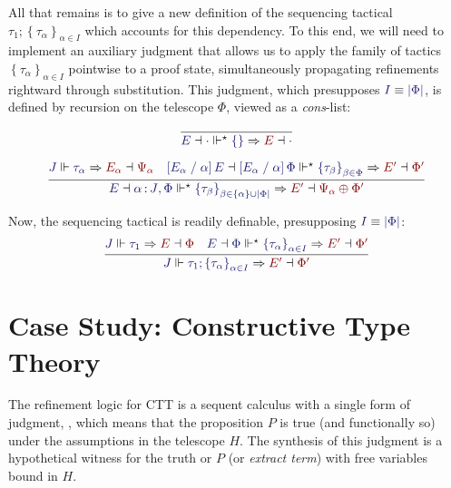 \documentclass[11pt]{article}
\theoremstyle{definition}
\theoremstyle{remark}
\numberwithin{equation}{section}
\def\IModeColorName{MidnightBlue}
\def\OModeColorName{Maroon}
\newcommand\IMode[1]{{\color{\IModeColorName}{#1}}}
\newcommand\OMode[1]{{\color{\OModeColorName}{#1}}}
\newcommand\JJ{J}
\newcommand\MkSet[1]{\left\{#1\right\}}
\newcommand\MkFam[3]{\MkSet{#1_{#2}}_{#2\in #3}}
\newcommand\ISG[2]{\IMode{#1}\,{\color{Black}:}\,\IMode{#2}}
\newcommand\Refine[4]{\IMode{#1}\Vdash\IMode{#2}\Rightarrow\OMode{#4}\dashv\OMode{#3}}
\newcommand\ThenMultiAux[5]{%
  \IMode{#2}\dashv\IMode{#3}%
  \Vdash^\star\IMode{#1}\Rightarrow%
  \OMode{#4}\dashv\OMode{#5}%
}
\newcommand\ThenTac[2]{#1;#2}
\newcommand\Dom[1]{\left\vert#1\right\vert}
\newcommand\Subst[3]{\left[#1\;/\;#2\right]#3}
\newcommand\IsEquiv[2]{\IMode{#1}\equiv\IMode{#2}}
\newcommand\Seq[2]{#1 \gg #2}
\begin{document}
All that remains is to give a new definition of the sequencing tactical
$\ThenTac{\tau_1}{\MkFam{\tau}{\alpha}{I}}$ which accounts for this dependency.
To this end, we will need to implement an auxiliary judgment
\framebox{$\ThenMultiAux{\MkFam{\tau}{\alpha}{I}}{E}{\Phi}{E'}{\Phi'}$} that
allows us to apply the family of tactics $\MkFam{\tau}{\alpha}{I}$ pointwise to
a proof state, simultaneously propagating refinements rightward through
substitution. This judgment, which presupposes $\IsEquiv{I}{\Dom\Phi}$, is
defined by recursion on the telescope $\Phi$, viewed as a \emph{cons}-list:

\begin{gather*}
  \infer{
    \ThenMultiAux{\MkSet{}}{E}{\cdot}{E}{\cdot}
  }{
  }\\[6pt]
  \infer{
    \ThenMultiAux{
      \MkFam{\tau}{\beta}{\MkSet{\alpha}\cup\Dom\Phi}
    }{E}{
      \ISG{\alpha}{\JJ},\Phi
    }{E'}{
      \Psi_\alpha\oplus\Phi'
    }
  }{
    \Refine{\JJ}{\tau_\alpha}{\Psi_\alpha}{E_\alpha} &
    \ThenMultiAux{
      \MkFam{\tau}{\beta}{\Phi}
    }{
      \Subst{E_\alpha}{\alpha}{E}%
    }{
      \Subst{E_\alpha}{\alpha}{\Phi}
    }{E'}{\Phi'}
  }
\end{gather*}

Now, the sequencing tactical is readily definable, presupposing $\IsEquiv{I}{\Dom\Phi}$:
\[
  \infer{
    \Refine{\JJ}{\ThenTac{\tau_1}{\MkFam{\tau}{\alpha}{I}}}{\Phi'}{E'}
  }{
    \Refine{\JJ}{\tau_1}{\Phi}{E} &
    \ThenMultiAux{
      \MkFam{\tau}{\alpha}{I}
    }{E}{\Phi}{E'}{\Phi'}
  }
\]

\section{Case Study: Constructive Type Theory}


The refinement logic for CTT is a sequent calculus with a single form of
judgment, \framebox{$\Seq{\IMode{H}}{\IMode{P}}$}, which means that the
proposition $P$ is true (and functionally so) under the assumptions in the
telescope $H$. The synthesis of this judgment is a hypothetical witness for the
truth or $P$ (or \emph{extract term}) with free variables bound in $H$.
\end{document}

